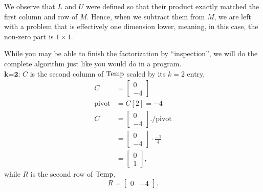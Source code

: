 \begin{tcolorbox}[sharp corners, colback=green!30, colframe=green!80!blue, title=\textbf{\large Why LU Factorization Works}]
We observe that $L$ and $U$ were defined so that their product exactly matched the first column and row of $M$. Hence, when we subtract them from $M$, we are left with a problem that is effectively one dimension lower, meaning, in this case, the non-zero part is $1 \times 1$. 
\end{tcolorbox}
While you may be able to finish the factorization by ``inspection'', we will do the complete algorithm just like you would do in a program.\\

$\textbf{k=2:}$ $C$ is the second column of ${\rm Temp}$ scaled by its $k=2$ entry,
\begin{align*}C&=\left[\begin{array}{r} 0\\  -4 \end{array} \right]\\
\textrm{pivot}&=C[2] = -4\\
C&=\left[\begin{array}{r} 0\\  -4 \end{array} \right].\slash \textrm{pivot} \\
&= \left[\begin{array}{r} 0\\  -4 \end{array} \right] \cdot \frac{-1}{4}\\
&= \left[\begin{array}{r} 0\\  1 \end{array} \right], 
\end{align*}
while $R$ is the second row of ${\rm Temp}$,
$$ R = \left[\begin{array}{rr} 0 & -4 \end{array} \right].$$

